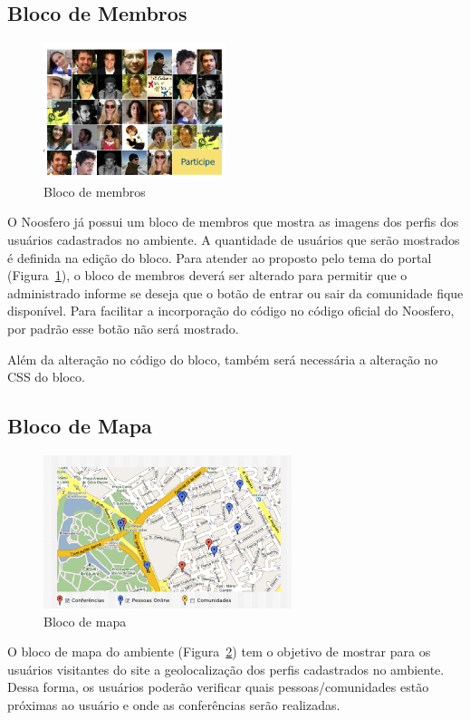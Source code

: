 \documentclass[[a4paper,11pt]{article}
\begin{document}
\subsection{Bloco de Membros}

\begin{figure}[h]
\center
\includegraphics[scale=0.4]{bloco-integrantes.png}
\caption{Bloco de membros}
\label{fig:bloco-integrantes}
\end{figure}

O Noosfero já possui um bloco de membros que mostra as imagens dos
perfis dos usuários cadastrados no ambiente. A quantidade de usuários
que serão mostrados é definida na edição do bloco. Para atender ao
proposto pelo tema do portal (Figura~\ref{fig:bloco-integrantes}), o bloco de
membros deverá ser alterado para permitir que o administrado informe se
deseja que o botão de entrar ou sair da comunidade fique disponível.
Para facilitar a incorporação do código no código oficial do Noosfero,
por padrão esse botão não será mostrado.

Além da alteração no código do bloco, também será necessária a alteração
no CSS do bloco.

\subsection{Bloco de Mapa}

\begin{figure}[h]
\center
\includegraphics[scale=0.4]{bloco-mapa.png}
\caption{Bloco de mapa}
\label{fig:bloco-mapa}
\end{figure}

O bloco de mapa do ambiente (Figura~\ref{fig:bloco-mapa}) tem o objetivo de mostrar para os usuários
visitantes do site a geolocalização dos perfis cadastrados no ambiente.
Dessa forma, os usuários poderão verificar quais pessoas/comunidades
estão próximas ao usuário e onde as conferências serão realizadas.
\end{document}
